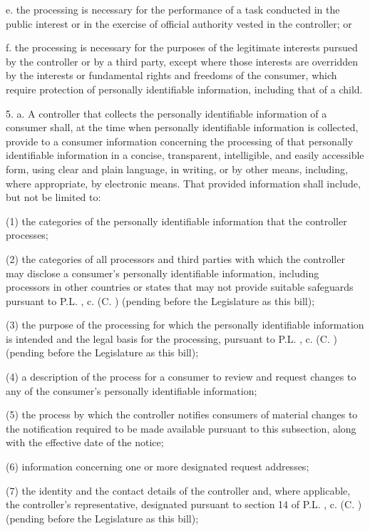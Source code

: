      e.     the processing is necessary for the performance of a task conducted in the public interest or in the exercise of official authority vested in the controller; or

     f.     the processing is necessary for the purposes of the legitimate interests pursued by the controller or by a third party, except where those interests are overridden by the interests or fundamental rights and freedoms of the consumer, which require protection of personally identifiable information, including that of a child.

 

     5.    a.  A controller that collects the personally identifiable information of a consumer shall, at the time when personally identifiable information is collected, provide to a consumer information concerning the processing of that personally identifiable information in a concise, transparent, intelligible, and easily accessible form, using clear and plain language, in writing, or by other means, including, where appropriate, by electronic means. That provided information shall include, but not be limited to:

     (1)   the categories of the personally identifiable information that the controller processes;

     (2)   the categories of all processors and third parties with which the controller may disclose a consumer's personally identifiable information, including processors in other countries or states that may not provide suitable safeguards pursuant to P.L.    , c.    (C.      ) (pending before the Legislature as this bill);

     (3)   the purpose of the processing for which the personally identifiable information is intended and the legal basis for the processing, pursuant to P.L.    , c.    (C.      ) (pending before the Legislature as this bill);

     (4)   a description of the process for a consumer to review and request changes to any of the consumer's personally identifiable information;

     (5)   the process by which the controller notifies consumers of material changes to the notification required to be made available pursuant to this subsection, along with the effective date of the notice;

     (6)   information concerning one or more designated request addresses;

     (7)   the identity and the contact details of the controller and, where applicable, the controller's representative, designated pursuant to section 14 of P.L.    , c.    (C.      ) (pending before the Legislature as this bill);

